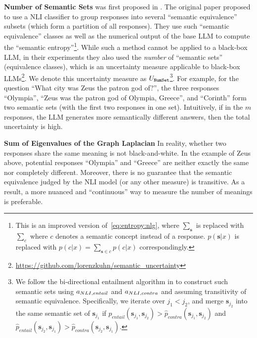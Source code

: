 \textbf{Number of Semantic Sets}
was first proposed in \citet{kuhn2023semantic}.
The original paper proposed to use a NLI classifier to group responses into several ``semantic equivalence'' subsets (which form a partition of all responses).
They use such ``semantic equivalence'' classes as well as the numerical output of the base LLM to compute the ``semantic entropy''\footnote{This is an improved version of~\cref{eq:entropy:nlg}, where $\sum_{\mathbf{s}}$ is replaced with $\sum_{c}$ where $c$ denotes a semantic concept instead of a response. $p(\mathbf{s}|x)$ is replaced with $p(c|x)=\sum_{\mathbf{s}\in c} p(c|x)$ correspondingly.}.
While such a method cannot be applied to a black-box LLM, in their experiments they also used the \textit{number} of ``semantic sets'' (equivalence classes), which is an uncertainty measure applicable to black-box LLMs\footnote{\url{https://github.com/lorenzkuhn/semantic_uncertainty}}. 
We denote this uncertainty measure as $U_{\texttt{NumSet}}$\footnote{We follow the bi-directional entailment algorithm in \citet{kuhn2023semantic} to construct such semantic sets using $a_{NLI,entail}$ and $a_{NLI,contra}$ and assuming transitivity of semantic equivalence.
Specifically, we iterate over $j_1<j_2$, and merge $\mathbf{s}_{j_2}$ into the same semantic set of $\mathbf{s}_{j_1}$ if $\hat{p}_{entail}(\mathbf{s}_{j_1},\mathbf{s}_{j_2}) > \hat{p}_{contra}(\mathbf{s}_{j_1},\mathbf{s}_{j_2})$ and $\hat{p}_{entail}(\mathbf{s}_{j_2},\mathbf{s}_{j_1}) > \hat{p}_{contra}(\mathbf{s}_{j_2},\mathbf{s}_{j_1})$.}.
For example, for the question ``What city was Zeus the patron god of?'', the three responses ``Olympia'', ``Zeus was the patron god of Olympia, Greece'', and ``Corinth'' form two semantic sets (with the first two responses in one set). 
Intuitively, if in the $m$ responses, the LLM generates more semantically different answers, then the total uncertainty is high. 




\textbf{Sum of Eigenvalues of the Graph Laplacian}
In reality, whether two responses share the same meaning is not black-and-white.
In the example of Zeus above, potential responses ``Olympia'' and ``Greece'' are neither exactly the same nor completely different. 
Moreover, there is no guarantee that the semantic equivalence judged by the NLI model (or any other measure) is transitive. 
As a result, a more nuanced and ``continuous'' way to measure the number of meanings is preferable. 


